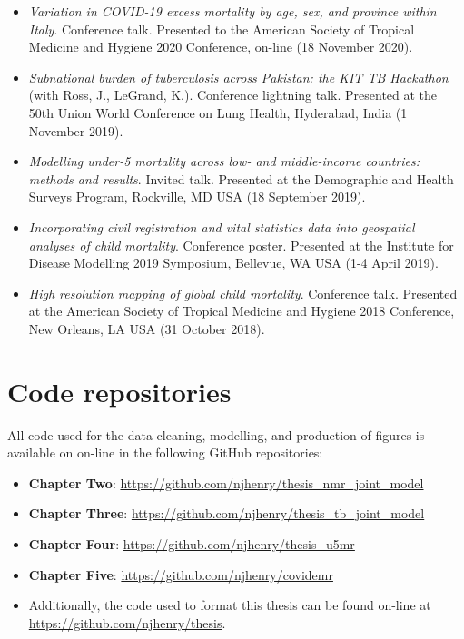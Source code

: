 \documentclass[
]{report}
\providecommand{\tightlist}{%
  \setlength{\itemsep}{0pt}\setlength{\parskip}{0pt}}
\begin{document}
\begin{itemize}
\item
  \emph{Variation in COVID-19 excess mortality by age, sex, and province within Italy}. Conference talk. Presented to the American Society of Tropical Medicine and Hygiene 2020 Conference, on-line (18 November 2020).
\item
  \emph{Subnational burden of tuberculosis across Pakistan: the KIT TB Hackathon} (with Ross, J., LeGrand, K.). Conference lightning talk. Presented at the 50th Union World Conference on Lung Health, Hyderabad, India (1 November 2019).
\item
  \emph{Modelling under-5 mortality across low- and middle-income countries: methods and results}. Invited talk. Presented at the Demographic and Health Surveys Program, Rockville, MD USA (18 September 2019).
\item
  \emph{Incorporating civil registration and vital statistics data into geospatial analyses of child mortality}. Conference poster. Presented at the Institute for Disease Modelling 2019 Symposium, Bellevue, WA USA (1-4 April 2019).
\item
  \emph{High resolution mapping of global child mortality}. Conference talk. Presented at the American Society of Tropical Medicine and Hygiene 2018 Conference, New Orleans, LA USA (31 October 2018).
\end{itemize}

\hypertarget{code-repositories}{%
\chapter{Code repositories}\label{code-repositories}}

All code used for the data cleaning, modelling, and production of figures is available on on-line in the following GitHub repositories:

\begin{itemize}
\tightlist
\item
  \textbf{Chapter Two}: \url{https://github.com/njhenry/thesis_nmr_joint_model}
\item
  \textbf{Chapter Three}: \url{https://github.com/njhenry/thesis_tb_joint_model}
\item
  \textbf{Chapter Four}: \url{https://github.com/njhenry/thesis_u5mr}
\item
  \textbf{Chapter Five}: \url{https://github.com/njhenry/covidemr}
\item
  Additionally, the code used to format this thesis can be found on-line at \url{https://github.com/njhenry/thesis}.
\end{itemize}


\printbibliography
\end{document}
